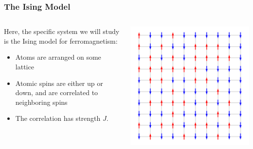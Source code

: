 \documentclass[aspectratio=169, 12pt]{beamer}
\begin{document}
\begin{frame}
    \frametitle{The Ising Model}

    \begin{columns}
        \begin{column}{.6\textwidth}
            
            Here, the specific system we will study is the Ising model for ferromagnetism:
            \begin{itemize}
                \item Atoms are arranged on some lattice
                \item Atomic spins are either up or down, and are correlated to neighboring spins
                \item The correlation has strength $J$. 
            \end{itemize}
            
        \end{column}
        \begin{column}{.4\textwidth}
            \includegraphics[width=\textwidth]{images/ising-spins-grid.png}
        \end{column}
    \end{columns}
\end{frame}
    
\end{document}
